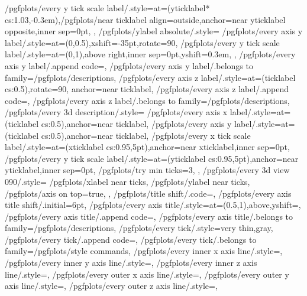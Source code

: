 {{		/pgfplots/every y tick scale label/.style={at={(yticklabel* cs:1.03,-0.3em)},/pgfplots/near ticklabel align=outside,anchor=near yticklabel opposite,inner sep=0pt},
	},%
	/pgfplots/ylabel absolute/.style={%
		/pgfplots/every axis y label/.style={at={(0,0.5)},xshift=-35pt,rotate=90},
		/pgfplots/every y tick scale label/.style={at={(0,1)},above right,inner sep=0pt,yshift=0.3em},
	},%
	/pgfplots/every axis y label/.append code={},
	/pgfplots/every axis y label/.belongs to family=/pgfplots/descriptions,
	/pgfplots/every axis z label/.style={at={(ticklabel cs:0.5)},rotate=90, anchor=near ticklabel},
	/pgfplots/every axis z label/.append code={},
	/pgfplots/every axis z label/.belongs to family=/pgfplots/descriptions,
	/pgfplots/every 3d description/.style={%
		/pgfplots/every axis x label/.style={at={(ticklabel cs:0.5)},anchor=near ticklabel},%
		/pgfplots/every axis y label/.style={at={(ticklabel cs:0.5)},anchor=near ticklabel},%
		/pgfplots/every x tick scale label/.style={at={(xticklabel cs:0.95,5pt)},anchor=near xticklabel,inner sep=0pt},
		/pgfplots/every y tick scale label/.style={at={(yticklabel cs:0.95,5pt)},anchor=near yticklabel,inner sep=0pt},
		/pgfplots/try min ticks=3,%
	},%
	/pgfplots/every 3d view {0}{90}/.style={%
		/pgfplots/xlabel near ticks,%
		/pgfplots/ylabel near ticks,%
		/pgfplots/axis on top=true,%
	},%
	/pgfplots/title shift/.code={},%
	/pgfplots/every axis title shift/.initial=6pt,
	/pgfplots/every axis title/.style={at={(0.5,1)},above,yshift=},
	/pgfplots/every axis title/.append code={},
	/pgfplots/every axis title/.belongs to family=/pgfplots/descriptions,
	/pgfplots/every tick/.style={very thin,gray},
	/pgfplots/every tick/.append code={},
	/pgfplots/every tick/.belongs to family=/pgfplots/style commands,
	/pgfplots/every inner x axis line/.style={},
	/pgfplots/every inner y axis line/.style={},
	/pgfplots/every inner z axis line/.style={},
	/pgfplots/every outer x axis line/.style={},
	/pgfplots/every outer y axis line/.style={},
	/pgfplots/every outer z axis line/.style={},
}
